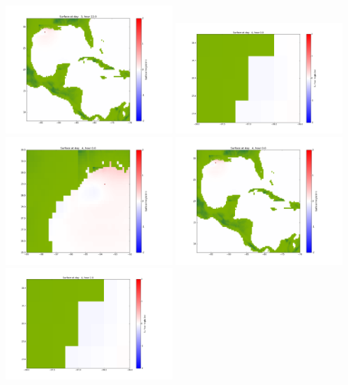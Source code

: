 \documentclass[11pt]{article}
\begin{document}
\vskip 10pt 
\includegraphics[width=0.475\textwidth]{frame0071fig1003.png}
\vskip 10pt 
\includegraphics[width=0.475\textwidth]{frame0072fig1001.png}
\includegraphics[width=0.475\textwidth]{frame0072fig1002.png}
\vskip 10pt 
\includegraphics[width=0.475\textwidth]{frame0072fig1003.png}
\vskip 10pt 
\includegraphics[width=0.475\textwidth]{frame0073fig1001.png}
\end{document}

